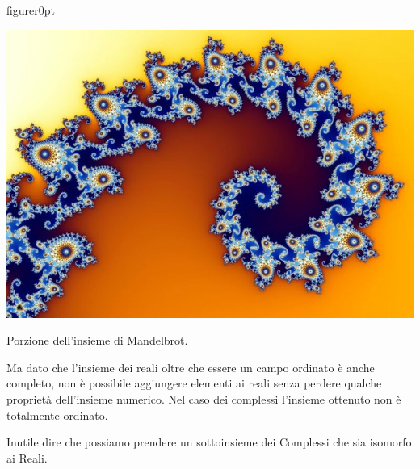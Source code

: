 \begin{wrapfloat}{figure}{r}{0pt}
\begin{inaccessibleblock}
\includegraphics[scale=0.30]{img/fractal.jpg}
\end{inaccessibleblock}
\caption{Porzione dell'insieme di Mandelbrot.}
\label{fig:mandelbrot}
\end{wrapfloat}
Ma dato che l'insieme dei reali oltre che essere un campo ordinato è anche 
completo, non è possibile aggiungere elementi ai reali senza perdere 
qualche proprietà dell'insieme numerico. 
Nel caso dei complessi l'insieme ottenuto non è totalmente ordinato.

Inutile dire che possiamo prendere un sottoinsieme dei Complessi che sia 
isomorfo ai Reali.







































